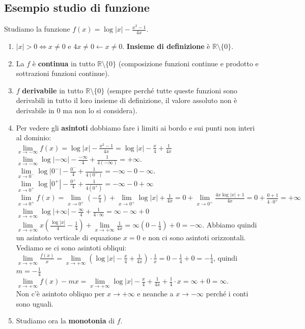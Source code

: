\subsection{Esempio studio di funzione}
\begin{example}
Studiamo la funzione $f(x) = \log|x| - \frac{x^2 - 1}{4x}$.
\begin{enumerate}
    \item $|x| > 0 \Longleftrightarrow x\neq 0$ e $4x \neq 0 \longleftarrow x \neq 0$. \textbf{Insieme di definizione} è $\mathbb{R} \setminus \{0\}$.
    \item La $f$ è \textbf{continua} in tutto $\mathbb{R} \setminus \{0\}$ (composizione funzioni continue e prodotto e sottrazioni funzioni continue).
    \item $f$ \textbf{derivabile} in tutto $\mathbb{R} \setminus \{0\}$ (sempre perché tutte queste funzioni sono derivabili in tutto il loro insieme di definizione, il valore assoluto non è derivabile in 0 ma non lo si considera).
    \item Per vedere gli \textbf{asintoti} dobbiamo fare i limiti ai bordo e sui punti non interi al dominio:\\
    $\lim\limits_{x\to -\infty}f(x) = \log|x| - \frac{x^2 -1}{4x} = \log|x| - \frac{x}{4} + \frac{1}{4x}$ \hspace{.5cm} $\lim\limits_{x\to -\infty}\log|-\infty| - \frac{-\infty}{4} + \frac{1}{4(-\infty)} = + \infty$.\\
    $\lim\limits_{x\to 0^-}\log|0^-| - \frac{0^-}{4} + \frac{1}{4(0^-)} = -\infty - 0 - \infty$. \hspace{.5cm} 
    $\lim\limits_{x\to 0^+}\log|0^+| - \frac{0^+}{4} + \frac{1}{4(0^+)} = -\infty - 0 + \infty$\\
    $\lim\limits_{x\to 0^+}f(x) = \lim\limits_{x\to 0^+}(-\frac{x}{4}) + \lim\limits_{x\to 0^+}\log|x| + \frac{1}{4x} = 0 + \lim\limits_{x\to 0^+}\frac{4x\log|x| + 1}{4x} = 0 + \frac{0+1}{4 \cdot 0^+} = +\infty$\\
    $\lim\limits_{x\to +\infty} \log|+\infty| - \frac{\infty}{4} + \frac{1}{4 \cdot \infty} = \infty - \infty + 0$\\
    $\lim\limits_{x\to +\infty} x(\frac{\log|x|}{4} - \frac{1}{4}) + \lim\limits_{x\to +\infty} \frac{1}{4x} = \infty(0 - \frac{1}{4}) + 0 = -\infty.$
    Abbiamo quindi un asintoto verticale di equazione $x=0$ e non ci sono asintoti orizzontali. Vediamo se ci sono asintoti obliqui:
    $\lim\limits_{x\to +\infty}\frac{f(x)}{x} = \lim\limits_{x\to +\infty}(\log|x| -\frac{x}{4} + \frac{1}{4x}) \cdot \frac{1}{x} = 0 - \frac{1}{4} + 0 = -\frac{1}{4}$, quindi $m= -\frac{1}{4}$\\
    $\lim\limits_{x\to +\infty}f(x) -mx = \lim\limits_{x\to +\infty} \log|x| - \frac{x}{4} + \frac{1}{4x} + \frac{1}{4}\cdot x = \infty + 0 = \infty$. \\
    Non c'è asintoto obliquo per $x\to +\infty$ e neanche a $x\to -\infty$ perché i conti sono uguali.
    \item Studiamo ora la \textbf{monotonia} di $f$.
    

\end{enumerate}
\end{example}
